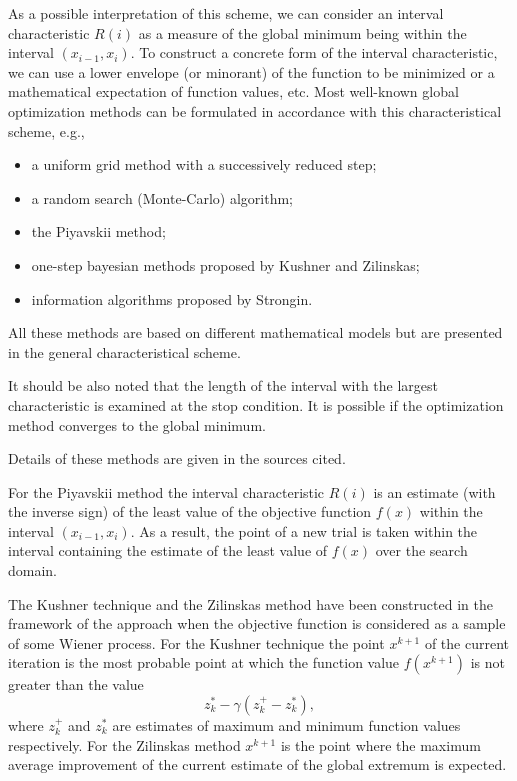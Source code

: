 \documentclass{svproc}
\begin{document}
As a possible interpretation of this scheme, we can consider an interval characteristic $R(i)$ as a measure of the global minimum being within the interval
$(x_{i-1},x_i)$.
To construct a concrete form of the interval characteristic, we can use a lower envelope (or minorant) of the function to be minimized or a mathematical expectation of function values, etc. 
Most well-known global optimization methods can be formulated in accordance with this characteristical scheme, e.g.,
\begin{itemize}
\item a uniform grid method with a successively reduced step;
\item a random search (Monte-Carlo) algorithm;
\item the Piyavskii method;
\item one-step bayesian methods proposed by Kushner and Zilinskas;
\item information algorithms proposed by Strongin.
\end{itemize}
All these methods are based on different mathematical models but are presented in the general characteristical scheme.

It should be also noted that the length of the interval with the largest characteristic is examined at the stop condition.
It is possible if the optimization method converges to the global minimum.

Details of these methods are given in the sources cited. %

For the Piyavskii method the interval characteristic $R(i)$ is an estimate (with the inverse sign) of the least value of the objective function $f(x)$ within the
interval $(x_{i-1},x_i)$. As a result, the point of a new trial is taken within the interval containing the estimate of the least value of $f(x)$ over the search domain.

The Kushner technique and the Zilinskas method have been constructed in the framework of the approach when the objective function is considered as
a sample of some Wiener process. For the Kushner technique the point $x^{k+1}$ of the current iteration is the most probable point at which the function value
$f(x^{k+1})$ is not greater than the value
\[
z_k^* -\gamma (z_k^+-z_k^*),
\]
where $z_k^+$ and $z_k^*$ are estimates of maximum and minimum function values respectively. For the Zilinskas method $x^{k+1}$ is the point where the maximum average improvement of the current estimate of the global extremum is expected.
\end{document}
